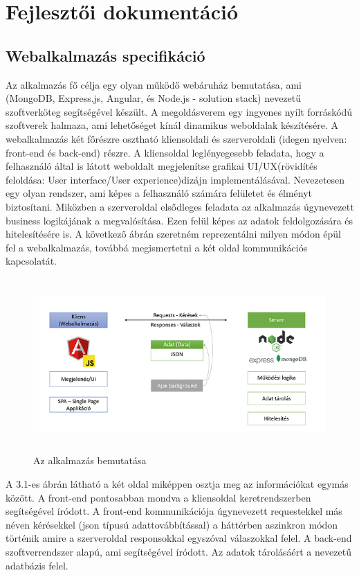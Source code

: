 \chapter{Fejlesztői dokumentáció} %
\label{ch:impl}

\section{Webalkalmazás specifikáció}
Az alkalmazás fő célja egy olyan működő webáruház bemutatása, ami \citeauthor{MEAN} (MongoDB, Express.js, Angular, és Node.js - solution stack) nevezetű szoftverköteg segítségével készült. A \citeauthor{MEAN}  megoldásverem egy ingyenes nyílt forráskódú szoftverek halmaza, ami lehetőséget kínál dinamikus weboldalak készítésére. A webalkalmazás két főrészre osztható kliensoldali és szerveroldali (idegen nyelven: front-end és back-end) részre. A kliensoldal leglényegesebb feladata, hogy a felhasználó által is látott weboldalt megjelenítse grafikai UI/UX(rövidítés feloldása: User interface/User experience)dizájn implementálásával. Nevezetesen egy olyan rendszer, ami képes a felhasználó számára felületet és élményt biztosítani. Miközben a szerveroldal elsődleges feladata az alkalmazás úgynevezett business logikájának a megvalósítása. Ezen felül képes az adatok feldolgozására és hitelesítésére is. A következő ábrán szeretném reprezentálni milyen módon épül fel a webalkalmazás, továbbá megismertetni a két oldal kommunikációs kapcsolatát.

\begin{figure}[H]
	\centering
	\includegraphics[width=1.0\textwidth,height=250px]{images/alkalmazas_bemutatasa.png}
	\caption{Az alkalmazás bemutatása}
	\label{fig.picture-1}
\end{figure}

A 3.1-es ábrán látható a két oldal miképpen osztja meg az információkat egymás között. A front-end pontosabban mondva a kliensoldal \citeauthor{Angular} keretrendszerben \citeauthor{TypeScript} segítségével íródott. A front-end kommunikációja úgynevezett requestekkel más néven kérésekkel (json típusú adattovábbítással) a háttérben aszinkron módon történik amire a szerveroldal responsokkal egyszóval válaszokkal felel. A back-end \citeauthor{Node.js} szoftverrendszer alapú, ami \citeauthor{Express} segítségével íródott. Az adatok tárolásáért a \citeauthor{MongoDB} nevezetű adatbázis felel.


